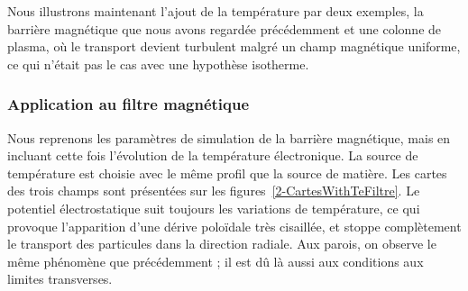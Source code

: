 \begin{refsection}
Nous illustrons maintenant l'ajout de la température par deux exemples, la
barrière magnétique que nous avons regardée précédemment et une colonne de
plasma, où le transport devient turbulent malgré un champ magnétique uniforme, ce qui
n'était pas le cas avec une hypothèse isotherme.

	\subsubsection{Application au filtre magnétique}

Nous reprenons les paramètres de simulation de la barrière magnétique, mais en
incluant cette fois l'évolution de la température électronique. La source
de température est choisie avec le même profil que la source de matière. Les
cartes des trois champs sont présentées sur les
figures~\ref{2-CartesWithTeFiltre}. Le potentiel électrostatique suit toujours
les variations de température, ce qui provoque l'apparition d'une dérive
poloïdale très cisaillée, et stoppe complètement le transport des particules
dans la direction radiale. Aux parois, on observe le même phénomène que
précédemment ; il est dû là aussi aux conditions aux limites transverses.


\end{refsection}
